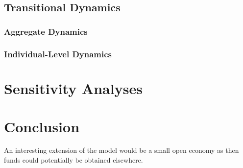 \documentclass[12pt]{article} %
\numberwithin{equation}{section} %
\begin{document}
\subsection{Transitional Dynamics}
\label{sec:results-transition}

\subsubsection{Aggregate Dynamics}
\label{sec:results-transition-agg}

\subsubsection{Individual-Level Dynamics}
\label{sec:results-transition-ind}

\section{Sensitivity Analyses}
\label{sec:sensitivity}

\section{Conclusion}
\label{sec:conclusion}

An interesting extension of the model would be a small open economy as then funds could potentially be obtained elsewhere.

\newpage
\thispagestyle{plain}
\printbibliography[heading=bibintoc] %
\end{document}
